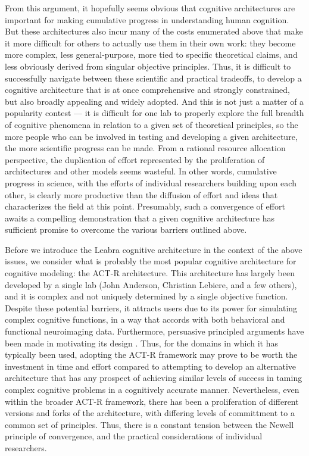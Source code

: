 \documentclass[11pt,twoside]{article}
\begin{document}
From this argument, it hopefully seems obvious that cognitive architectures are important for making cumulative progress in understanding human cognition.  But these architectures also incur many of the costs enumerated above that make it more difficult for others to actually use them in their own work: they become more complex, less general-purpose, more tied to specific theoretical claims, and less obviously derived from singular objective principles.  Thus, it is difficult to successfully navigate between these scientific and practical tradeoffs, to develop a cognitive architecture that is at once comprehensive and strongly constrained, but also broadly appealing and widely adopted.  And this is not just a matter of a popularity contest --- it is difficult for one lab to properly explore the full breadth of cognitive phenomena in relation to a given set of theoretical principles, so the more people who can be involved in testing and developing a given architecture, the more scientific progress can be made.  From a rational resource allocation perspective, the duplication of effort represented by the proliferation of architectures and other models seems wasteful.  In other words, cumulative progress in science, with the efforts of individual researchers building upon each other, is clearly more productive than the diffusion of effort and ideas that characterizes the field at this point.  Presumably, such a convergence of effort awaits a compelling demonstration that a given cognitive architecture has sufficient promise to overcome the various barriers outlined above.

Before we introduce the Leabra cognitive architecture in the context of the above issues, we consider what is probably the most popular cognitive architecture for cognitive modeling: the ACT-R architecture.  This architecture has largely been developed by a single lab (John Anderson, Christian Lebiere, and a few others), and it is complex and not uniquely determined by a single objective function.  Despite these potential barriers, it attracts users due to its power for simulating complex cognitive functions, in a way that accords with both behavioral and functional neuroimaging data.  Furthermore, persuasive principled arguments have been made in motivating its design \cite{AndersonBooks}.  Thus, for the domains in which it has typically been used, adopting the ACT-R framework may prove to be worth the investment in time and effort compared to attempting to develop an alternative architecture that has any prospect of achieving similar levels of success in taming complex cognitive problems in a cognitively accurate manner.  Nevertheless, even within the broader ACT-R framework, there has been a proliferation of different versions and forks of the architecture, with differing levels of committment to a common set of principles.  Thus, there is a constant tension between the Newell principle of convergence, and the practical considerations of individual researchers.
\end{document}

